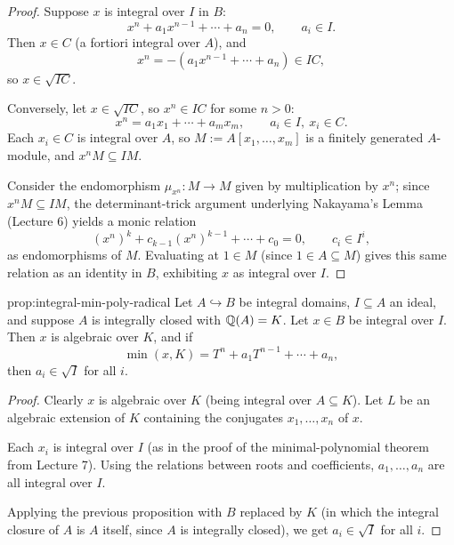 \begin{proof}
Suppose $x$ is integral over $I$ in $B$:
\[
x^n + a_1x^{n-1} + \cdots + a_n = 0, \qquad a_i \in I.
\]
Then $x \in C$ (a fortiori integral over $A$), and
\[
x^n = -(a_1x^{n-1}+\cdots+a_n) \in IC,
\]
so $x \in \sqrt{IC}$.

Conversely, let $x \in \sqrt{IC}$, so $x^n \in IC$ for some $n>0$:
\[
x^n = a_1x_1 + \cdots + a_mx_m, \qquad a_i \in I,\ x_i \in C.
\]
Each $x_i \in C$ is integral over $A$, so $M := A[x_1,\ldots,x_m]$ is a finitely generated $A$-module, and $x^nM \subseteq IM$.

Consider the endomorphism $\mu_{x^n}: M \to M$ given by multiplication by $x^n$; since $x^nM \subseteq IM$, the determinant-trick argument underlying Nakayama's Lemma (Lecture 6) yields a monic relation
\[
(x^n)^k + c_{k-1}(x^n)^{k-1} + \cdots + c_0 = 0, \qquad c_i \in I^i,
\]
as endomorphisms of $M$. Evaluating at $1 \in M$ (since $1 \in A \subseteq M$) gives this same relation as an identity in $B$, exhibiting $x$ as integral over $I$.
\end{proof}

\begin{proposition}{}{prop:integral-min-poly-radical}
Let $A \hookrightarrow B$ be integral domains, $I \subseteq A$ an ideal, and suppose $A$ is integrally closed with $\mathbb{Q}(A) = K$. Let $x \in B$ be integral over $I$. Then $x$ is algebraic over $K$, and if
\[
\min(x,K) = T^n + a_1T^{n-1} + \cdots + a_n,
\]
then $a_i \in \sqrt I$ for all $i$.
\end{proposition}

\begin{proof}
Clearly $x$ is algebraic over $K$ (being integral over $A \subseteq K$). Let $L$ be an algebraic extension of $K$ containing the conjugates $x_1,\ldots,x_n$ of $x$.

Each $x_i$ is integral over $I$ (as in the proof of the minimal-polynomial theorem from Lecture 7). Using the relations between roots and coefficients, $a_1,\ldots,a_n$ are all integral over $I$.

Applying the previous proposition with $B$ replaced by $K$ (in which the integral closure of $A$ is $A$ itself, since $A$ is integrally closed), we get $a_i \in \sqrt I$ for all $i$.
\end{proof}

